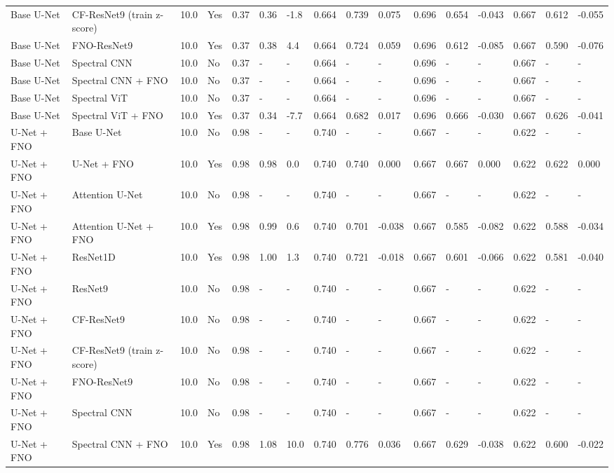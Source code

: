 \begin{longtable}{llllllllllllllll}
Base U-Net & CF-ResNet9 (train z-score) & 10.0 & Yes & 0.37 & 0.36 & -1.8 & 0.664 & 0.739 & 0.075 & 0.696 & 0.654 & -0.043 & 0.667 & 0.612 & -0.055 \\
Base U-Net & FNO-ResNet9 & 10.0 & Yes & 0.37 & 0.38 & 4.4 & 0.664 & 0.724 & 0.059 & 0.696 & 0.612 & -0.085 & 0.667 & 0.590 & -0.076 \\
Base U-Net & Spectral CNN & 10.0 & No & 0.37 & - & - & 0.664 & - & - & 0.696 & - & - & 0.667 & - & - \\
Base U-Net & Spectral CNN + FNO & 10.0 & No & 0.37 & - & - & 0.664 & - & - & 0.696 & - & - & 0.667 & - & - \\
Base U-Net & Spectral ViT & 10.0 & No & 0.37 & - & - & 0.664 & - & - & 0.696 & - & - & 0.667 & - & - \\
Base U-Net & Spectral ViT + FNO & 10.0 & Yes & 0.37 & 0.34 & -7.7 & 0.664 & 0.682 & 0.017 & 0.696 & 0.666 & -0.030 & 0.667 & 0.626 & -0.041 \\
U-Net + FNO & Base U-Net & 10.0 & No & 0.98 & - & - & 0.740 & - & - & 0.667 & - & - & 0.622 & - & - \\
U-Net + FNO & U-Net + FNO & 10.0 & Yes & 0.98 & 0.98 & 0.0 & 0.740 & 0.740 & 0.000 & 0.667 & 0.667 & 0.000 & 0.622 & 0.622 & 0.000 \\
U-Net + FNO & Attention U-Net & 10.0 & No & 0.98 & - & - & 0.740 & - & - & 0.667 & - & - & 0.622 & - & - \\
U-Net + FNO & Attention U-Net + FNO & 10.0 & Yes & 0.98 & 0.99 & 0.6 & 0.740 & 0.701 & -0.038 & 0.667 & 0.585 & -0.082 & 0.622 & 0.588 & -0.034 \\
U-Net + FNO & ResNet1D & 10.0 & Yes & 0.98 & 1.00 & 1.3 & 0.740 & 0.721 & -0.018 & 0.667 & 0.601 & -0.066 & 0.622 & 0.581 & -0.040 \\
U-Net + FNO & ResNet9 & 10.0 & No & 0.98 & - & - & 0.740 & - & - & 0.667 & - & - & 0.622 & - & - \\
U-Net + FNO & CF-ResNet9 & 10.0 & No & 0.98 & - & - & 0.740 & - & - & 0.667 & - & - & 0.622 & - & - \\
U-Net + FNO & CF-ResNet9 (train z-score) & 10.0 & No & 0.98 & - & - & 0.740 & - & - & 0.667 & - & - & 0.622 & - & - \\
U-Net + FNO & FNO-ResNet9 & 10.0 & No & 0.98 & - & - & 0.740 & - & - & 0.667 & - & - & 0.622 & - & - \\
U-Net + FNO & Spectral CNN & 10.0 & No & 0.98 & - & - & 0.740 & - & - & 0.667 & - & - & 0.622 & - & - \\
U-Net + FNO & Spectral CNN + FNO & 10.0 & Yes & 0.98 & 1.08 & 10.0 & 0.740 & 0.776 & 0.036 & 0.667 & 0.629 & -0.038 & 0.622 & 0.600 & -0.022 \\

\end{longtable}
